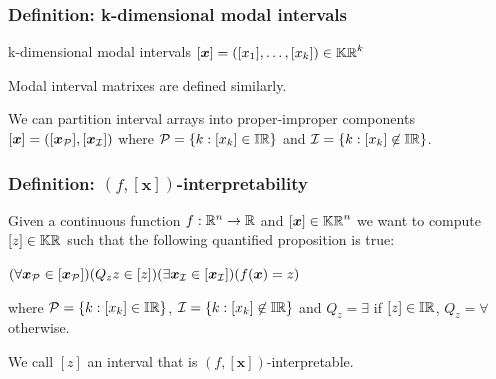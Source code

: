 \documentclass{beamer}
\begin{document}

\begin{frame}
    \frametitle{Definition: k-dimensional modal intervals}

    k-dimensional modal intervals $[\bm{x}] = ([x_1], \ldots, [x_k]) \in \mathbb{KR}^k$

    \vspace{7mm}
    Modal interval matrixes are defined similarly.

    \vspace{7mm}
    We can partition interval arrays into proper-improper components $[\bm{x}] = ([\bm{x}_\mathcal P], [\bm{x}_\mathcal I])$ where
    $\mathcal P = \left\{k : [x_k] \in \mathbb{IR}\right\}$ and $\mathcal I = \left\{k : [x_k] \not\in \mathbb{IR}\right\}$.

\end{frame}


\begin{frame}
    \frametitle{Definition: $(f,[\bm{x}])$-interpretability}
 
    Given a continuous function $f: \mathbb R^n \rightarrow \mathbb R$ and $[\bm{x}] \in \mathbb{KR}^n$ we want to compute $[z] \in \mathbb{KR}$ such that the following quantified proposition is true:

    \vspace{7mm}
    $(\forall \bm{x}_\mathcal P \in [\bm{x}_\mathcal P]) (Q_z z \in [z]) (\exists \bm{x}_\mathcal I \in [\bm{x}_\mathcal I]) (f(\bm{x}) = z)$

    \vspace{7mm}
    where $\mathcal P = \left\{k : [x_k] \in \mathbb{IR}\right\}$, $\mathcal I = \left\{k : [x_k] \not\in \mathbb{IR}\right\}$ and $Q_z = \exists$ if $[z] \in \mathbb{IR}$, $Q_z = \forall$ otherwise.

    \vspace{7mm}
    We call $[z]$ an interval that is $(f,[\bm{x}])$-interpretable.
\end{frame}

\end{document}
